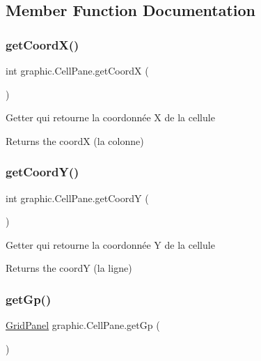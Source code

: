 \subsection{Member Function Documentation}
\hypertarget{classgraphic_1_1_cell_pane_a26561bfa4a8802268c9b081e5c5682f8}{}\label{classgraphic_1_1_cell_pane_a26561bfa4a8802268c9b081e5c5682f8} 
\subsubsection{\texorpdfstring{get\+Coord\+X()}{getCoordX()}}
{\footnotesize\ttfamily int graphic.\+Cell\+Pane.\+get\+CoordX (\begin{DoxyParamCaption}{ }\end{DoxyParamCaption})}

Getter qui retourne la coordonnée X de la cellule \begin{DoxyReturn}{Returns}
the coordX (la colonne) 
\end{DoxyReturn}
\hypertarget{classgraphic_1_1_cell_pane_a085ea8c70a07a051e103af3c89e66eb2}{}\label{classgraphic_1_1_cell_pane_a085ea8c70a07a051e103af3c89e66eb2} 
\subsubsection{\texorpdfstring{get\+Coord\+Y()}{getCoordY()}}
{\footnotesize\ttfamily int graphic.\+Cell\+Pane.\+get\+CoordY (\begin{DoxyParamCaption}{ }\end{DoxyParamCaption})}

Getter qui retourne la coordonnée Y de la cellule \begin{DoxyReturn}{Returns}
the coordY (la ligne) 
\end{DoxyReturn}
\hypertarget{classgraphic_1_1_cell_pane_a34a6be4ba7f268bc1cf97abb8133ea21}{}\label{classgraphic_1_1_cell_pane_a34a6be4ba7f268bc1cf97abb8133ea21} 
\subsubsection{\texorpdfstring{get\+Gp()}{getGp()}}
{\footnotesize\ttfamily \hyperlink{classgraphic_1_1_grid_panel}{Grid\+Panel} graphic.\+Cell\+Pane.\+get\+Gp (\begin{DoxyParamCaption}{ }\end{DoxyParamCaption})}

